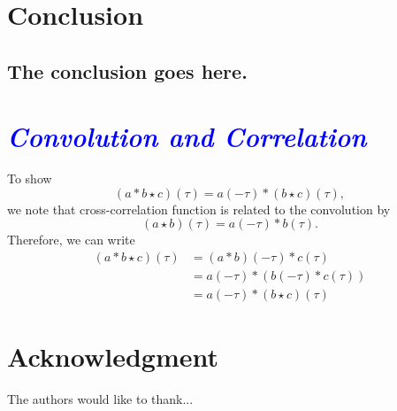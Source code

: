 \documentclass[conference]{IEEEtran}
\newcommand{\parham}[1]{\textsf{\emph{\textbf{\textcolor{blue}{#1}}}}}
\begin{document}
\section{Conclusion}
\subsection{The conclusion goes here.}




\appendix
\section*{\parham{Convolution and Correlation}}
To show 
\begin{equation}
 \left(a \ast b \star c\right)\left(\tau\right)  = a\left(-\tau\right)\ast\left(b \star c\right)\left(\tau\right),
\end{equation}
we note that cross-correlation function is related to the convolution by \cite{Yarlagadda2009}
\begin{equation}
 \left(a \star b\right)\left(\tau\right)= a\left(-\tau \right)\ast b\left(\tau\right).
\end{equation}
Therefore, we can write
\begin{align}
 \left(a \ast b \star c\right)\left(\tau\right)&= \left(a \ast b\right)\left(-\tau \right)\ast c\left(\tau\right) \nonumber \\
&=a\left(-\tau\right)\ast \left(b\left(-\tau\right) \ast c\left(\tau\right)\right)\nonumber \\
&=a\left(-\tau\right)\ast\left(b\star c\right)\left(\tau\right)
\end{align}



\section*{Acknowledgment}


The authors would like to thank...





\end{document}
